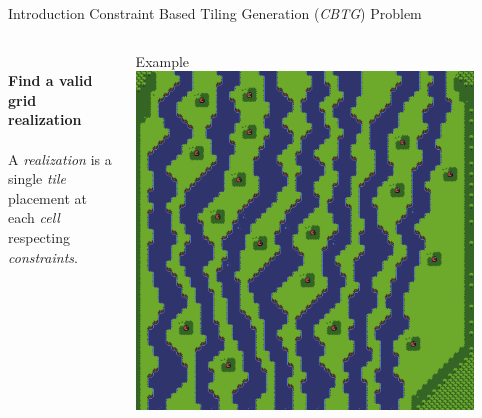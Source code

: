 \documentclass{beamer}
\begin{document}
  \begin{frame}[fragile]{Introduction}
    Constraint Based Tiling Generation (\textit{CBTG}) Problem
    \begin{columns}[T,onlytextwidth]
        \begin{block}{}
          \hfill \\
          \textbf{Find a valid grid realization}
          \hfill \\
          \hfill \\
          A \textit{realization} is a single \textit{tile} placement at each \textit{cell} \\
          respecting \textit{constraints}.

        \end{block}
        \begin{block}{Example}
          \includegraphics[width=0.9\textwidth]{img/forestmicro_64x64.pdf}
        \end{block}
    \end{columns}
  \end{frame}
\end{document}
